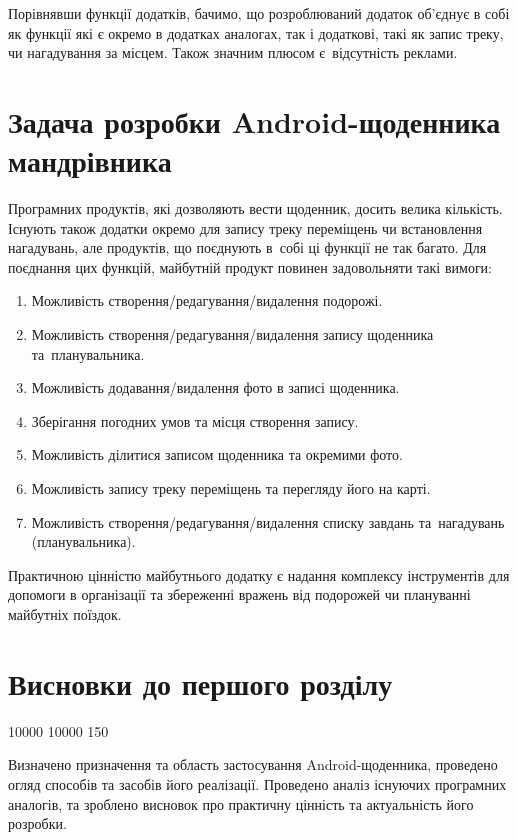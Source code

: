 \documentclass[../main.tex]{subfiles}
\begin{document}
{Порівнявши функції додатків, бачимо, що розроблюваний додаток об'єднує в собі як функції які є окремо в додатках аналогах, так і додаткові, такі як запис треку, чи нагадування за місцем. Також значним плюсом є~відсутність реклами.

}

\section{Задача розробки Android-щоденника мандрівника}

Програмних продуктів, які дозволяють вести щоденник, досить велика кількість. Існують також додатки окремо для запису треку переміщень чи встановлення нагадувань, але продуктів, що поєднують в~собі ці функції не так багато. Для поєднання цих функцій, майбутній продукт повинен задовольняти такі вимоги: 

\begin{enumerate}
	\item Можливість створення/редагування/видалення подорожі.
	\item Можливість створення/редагування/видалення запису щоденника та~планувальника.
	\item Можливість додавання/видалення фото в записі щоденника.
	\item Зберігання погодних умов та місця створення запису.
	\item Можливість ділитися записом щоденника та окремими фото.
	\item Можливість запису треку переміщень та перегляду його на карті.
	\item Можливість створення/редагування/видалення списку завдань та~нагадувань (планувальника).
\end{enumerate}

Практичною цінністю майбутнього додатку є надання комплексу інструментів для допомоги в організації та збереженні вражень від подорожей чи плануванні майбутніх поїздок.

\section{Висновки до першого розділу}

{
 10000 10000 150  %

Визначено призначення та область застосування Android-щоденника, проведено огляд способів та засобів його реалізації. Проведено аналіз існуючих програмних аналогів, та зроблено висновок про практичну цінність та актуальність його розробки.

}
\end{document}
